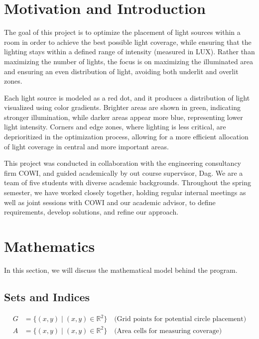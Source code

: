 \documentclass{article}
\begin{document}
\section{Motivation and Introduction}

The goal of this project is to optimize the placement of light sources within a room in order to achieve the best possible light coverage, while 
ensuring that the lighting stays within a defined range of intensity (measured in LUX). Rather than maximizing the number of lights, the focus is on 
maximizing the illuminated area and ensuring an even distribution of light, avoiding both underlit and overlit zones.

Each light source is modeled as a red dot, and it produces a distribution of light visualized using color gradients. Brighter areas are shown in green, 
indicating stronger illumination, while darker areas appear more blue, representing lower light intensity. Corners and edge zones, where lighting is less critical, 
are deprioritized in the optimization process, allowing for a more efficient allocation of light coverage in central and more important areas.

This project was conducted in collaboration with the engineering consultancy firm COWI, and guided academically by out course supervisor, Dag. We are a team of five 
students with diverse academic backgrounds. Throughout the spring semester, we have worked closely together, holding regular internal meetings as well as joint sessions 
with COWI and our academic advisor, to define requirements, develop solutions, and refine our approach.


\newpage

\section{Mathematics}

In this section, we will discuss the mathematical model behind the program.

\subsection{Sets and Indices}
\begin{align}
    G &= \{(x, y) \mid (x, y) \in \mathbb{R}^2\} \quad \text{(Grid points for potential circle placement)}\\
    A &= \{(x, y) \mid (x, y) \in \mathbb{R}^2\} \quad \text{(Area cells for measuring coverage)}
\end{align}
\end{document}
